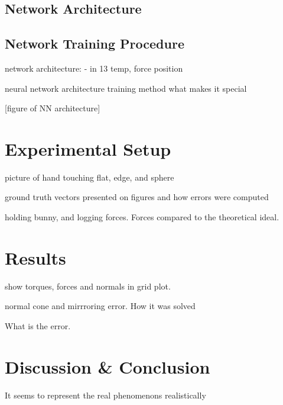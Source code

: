 \subsection{Network Architecture}\label{sec:1-tactile-perception-method-network-architecture}

\subsection{Network Training Procedure}\label{sec:1-tactile-perception-method-network-training-procedure}


network architecture:
 - in 13 temp, force position



neural network architecture
training method
what makes it special

[figure of NN architecture]

\section{Experimental Setup}\label{sec:1-tactile-perception-experimental-setup}

picture of hand touching flat, edge, and sphere

ground truth vectors presented on figures and how errors were computed

holding bunny, and logging forces. Forces compared to the theoretical ideal.


\section{Results}\label{sec:1-tactile-perception-results}

show torques, forces and normals in grid plot.

normal cone and mirrroring error. How it was solved


What is the error.

\section{Discussion \& Conclusion}\label{sec:1-tactile-perception-discussion-and-conclusion}

It seems to represent the real phenomenons realistically 



